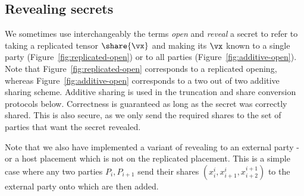 \subsection{Revealing secrets}

We sometimes use interchangeably the terms \textit{open} and \textit{reveal} a
secret to refer to taking a replicated tensor $\share{\vx}$ and making its $\vx$
known to a single party  (Figure~\ref{fig:replicated-open}) or to all parties
(Figure~\ref{fig:additive-open}).  Note that Figure~\ref{fig:replicated-open}
corresponds to a replicated opening, whereas Figure~\ref{fig:additive-open}
corresponds to a two out of two additive sharing scheme. Additive sharing is
used in the truncation and share conversion protocols below. Correctness is
guaranteed as long as the secret was correctly shared. This is also secure, as
we only send the required shares to the set of parties that want the secret
revealed.

Note that we also have implemented a variant of revealing to an external party - or a host placement which
is not on the replicated placement. This is a simple case where any two parties $P_i, P_{i+1}$ send their
shares $(x_i^i, x_{i+1}^i, x_{i+2}^{i+1})$ to the external party onto which are then added.

